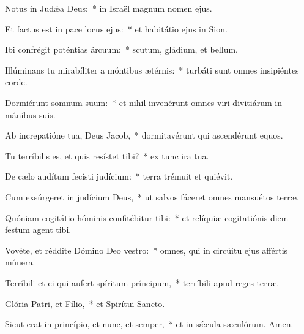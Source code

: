 \item Notus in Judǽa Deus:~* in Israël magnum nomen ejus.

\item Et factus est in pace locus ejus:~* et habitátio ejus in Sion.

\item Ibi confrégit poténtias árcuum:~* scutum, gládium, et bellum.

\item Illúminans tu mirabíliter a móntibus ætérnis:~* turbáti sunt omnes insipiéntes corde.

\item Dormiérunt somnum suum:~* et nihil invenérunt omnes viri divitiárum in mánibus suis.

\item Ab increpatióne tua, Deus Jacob,~* dormitavérunt qui ascendérunt equos.

\item Tu terríbilis es, et quis resístet tibi?~* ex tunc ira tua.

\item De cælo audítum fecísti judícium:~* terra trémuit et quiévit.

\item Cum exsúrgeret in judícium Deus,~* ut salvos fáceret omnes mansuétos terræ.

\item Quóniam cogitátio hóminis confitébitur tibi:~* et relíquiæ cogitatiónis diem festum agent tibi.

\item Vovéte, et réddite Dómino Deo vestro:~* omnes, qui in circúitu ejus affértis múnera.

\item Terríbili et ei qui aufert spíritum príncipum,~* terríbili apud reges terræ.

\item Glória Patri, et Fílio,~* et Spirítui Sancto.

\item Sicut erat in princípio, et nunc, et semper,~* et in sǽcula sæculórum. Amen.


